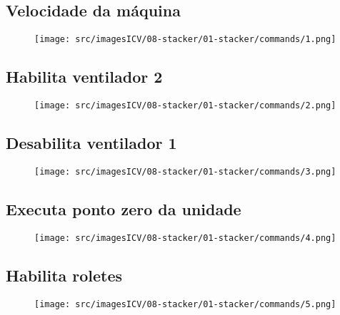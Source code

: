 \thispagestyle{fancy}
\vspace{\fill}
\subsection{\small Velocidade da máquina}
\begin{figure}
    \centering
    \texttt{[image: src/imagesICV/08-stacker/01-stacker/commands/1.png]}
\end{figure}

\newpage
\thispagestyle{fancy}
\vspace{\fill}
\subsection{\small Habilita ventilador 2}
\begin{figure}
    \centering
    \texttt{[image: src/imagesICV/08-stacker/01-stacker/commands/2.png]}
\end{figure}

\newpage
\thispagestyle{fancy}
\vspace{\fill}
\subsection{\small Desabilita ventilador 1}
\begin{figure}
    \centering
    \texttt{[image: src/imagesICV/08-stacker/01-stacker/commands/3.png]}
\end{figure}

\newpage
\thispagestyle{fancy}
\vspace{\fill}
\subsection{\small Executa ponto zero da unidade}
\begin{figure}
    \centering
    \texttt{[image: src/imagesICV/08-stacker/01-stacker/commands/4.png]}
\end{figure}

\newpage
\thispagestyle{fancy}
\vspace{\fill}
\subsection{\small Habilita roletes}
\begin{figure}
    \centering
    \texttt{[image: src/imagesICV/08-stacker/01-stacker/commands/5.png]}
\end{figure}

